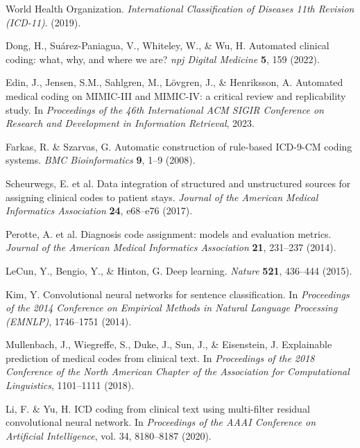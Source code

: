\documentclass[12pt,a4paper]{report}
\begin{document}
\begin{thebibliography}{99}

World Health Organization. \textit{International Classification of Diseases 11th Revision (ICD-11)}. (2019).

Dong, H., Suárez-Paniagua, V., Whiteley, W., \& Wu, H. Automated clinical coding: what, why, and where we are? \textit{npj Digital Medicine} \textbf{5}, 159 (2022).

Edin, J., Jensen, S.M., Sahlgren, M., Lövgren, J., \& Henriksson, A. Automated medical coding on MIMIC-III and MIMIC-IV: a critical review and replicability study. In \textit{Proceedings of the 46th International ACM SIGIR Conference on Research and Development in Information Retrieval}, 2023.

Farkas, R. \& Szarvas, G. Automatic construction of rule-based ICD-9-CM coding systems. \textit{BMC Bioinformatics} \textbf{9}, 1–9 (2008).

Scheurwegs, E. et al. Data integration of structured and unstructured sources for assigning clinical codes to patient stays. \textit{Journal of the American Medical Informatics Association} \textbf{24}, e68–e76 (2017).

Perotte, A. et al. Diagnosis code assignment: models and evaluation metrics. \textit{Journal of the American Medical Informatics Association} \textbf{21}, 231–237 (2014).

LeCun, Y., Bengio, Y., \& Hinton, G. Deep learning. \textit{Nature} \textbf{521}, 436–444 (2015).

Kim, Y. Convolutional neural networks for sentence classification. In \textit{Proceedings of the 2014 Conference on Empirical Methods in Natural Language Processing (EMNLP)}, 1746–1751 (2014).

Mullenbach, J., Wiegreffe, S., Duke, J., Sun, J., \& Eisenstein, J. Explainable prediction of medical codes from clinical text. In \textit{Proceedings of the 2018 Conference of the North American Chapter of the Association for Computational Linguistics}, 1101–1111 (2018).

Li, F. \& Yu, H. ICD coding from clinical text using multi-filter residual convolutional neural network. In \textit{Proceedings of the AAAI Conference on Artificial Intelligence}, vol. 34, 8180–8187 (2020).


\end{thebibliography}
\end{document}
